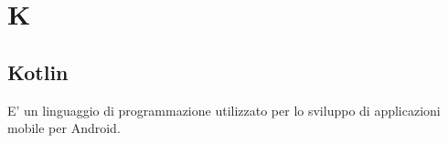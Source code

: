 \section*{K}

\subsection{Kotlin}
E' un linguaggio di programmazione utilizzato per lo sviluppo di applicazioni mobile per Android.